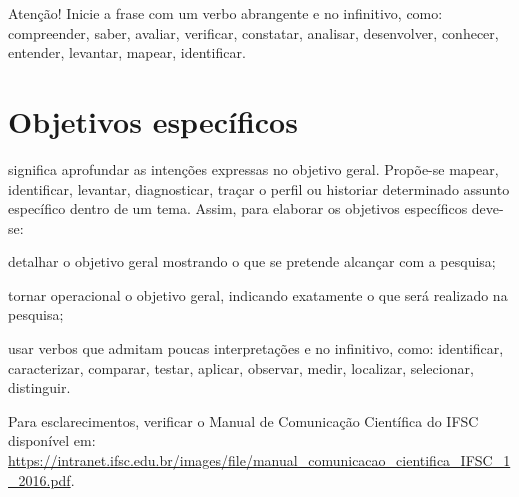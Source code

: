         Atenção! Inicie a frase com um verbo abrangente e no infinitivo, como: compreender, saber, avaliar, verificar, constatar, analisar,
        desenvolver, conhecer, entender, levantar, mapear, identificar.
    
    \section{Objetivos específicos}
    
    	significa aprofundar as intenções expressas no objetivo geral. Propõe-se mapear, identificar, levantar, diagnosticar, traçar o perfil ou historiar determinado assunto específico dentro de um tema. Assim, para elaborar os objetivos específicos deve-se:

    	\begin{alineas}
	    	\item detalhar o objetivo geral mostrando o que se pretende alcançar com a pesquisa;
	    	\item tornar operacional o objetivo geral, indicando exatamente o que será realizado na pesquisa;
	    	\item usar verbos que admitam poucas interpretações e no infinitivo, como: identificar, caracterizar, comparar, testar, aplicar, observar, medir, localizar, selecionar, distinguir. 
	    \end{alineas}
    
        Para esclarecimentos, verificar o Manual de Comunicação Científica do IFSC disponível em: 
        \url{https://intranet.ifsc.edu.br/images/file/manual_comunicacao_cientifica_IFSC_1_2016.pdf}.
